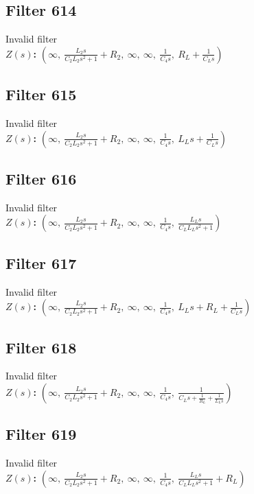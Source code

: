 \documentclass{article}
\begin{document}
\subsection*{Filter 614}
Invalid filter \\ 
\textbf{$Z(s)$:} $\left( \infty, \  \frac{L_{2} s}{C_{2} L_{2} s^{2} + 1} + R_{2}, \  \infty, \  \infty, \  \frac{1}{C_{4} s}, \  R_{L} + \frac{1}{C_{L} s}\right)$ \\ 
\subsection*{Filter 615}
Invalid filter \\ 
\textbf{$Z(s)$:} $\left( \infty, \  \frac{L_{2} s}{C_{2} L_{2} s^{2} + 1} + R_{2}, \  \infty, \  \infty, \  \frac{1}{C_{4} s}, \  L_{L} s + \frac{1}{C_{L} s}\right)$ \\ 
\subsection*{Filter 616}
Invalid filter \\ 
\textbf{$Z(s)$:} $\left( \infty, \  \frac{L_{2} s}{C_{2} L_{2} s^{2} + 1} + R_{2}, \  \infty, \  \infty, \  \frac{1}{C_{4} s}, \  \frac{L_{L} s}{C_{L} L_{L} s^{2} + 1}\right)$ \\ 
\subsection*{Filter 617}
Invalid filter \\ 
\textbf{$Z(s)$:} $\left( \infty, \  \frac{L_{2} s}{C_{2} L_{2} s^{2} + 1} + R_{2}, \  \infty, \  \infty, \  \frac{1}{C_{4} s}, \  L_{L} s + R_{L} + \frac{1}{C_{L} s}\right)$ \\ 
\subsection*{Filter 618}
Invalid filter \\ 
\textbf{$Z(s)$:} $\left( \infty, \  \frac{L_{2} s}{C_{2} L_{2} s^{2} + 1} + R_{2}, \  \infty, \  \infty, \  \frac{1}{C_{4} s}, \  \frac{1}{C_{L} s + \frac{1}{R_{L}} + \frac{1}{L_{L} s}}\right)$ \\ 
\subsection*{Filter 619}
Invalid filter \\ 
\textbf{$Z(s)$:} $\left( \infty, \  \frac{L_{2} s}{C_{2} L_{2} s^{2} + 1} + R_{2}, \  \infty, \  \infty, \  \frac{1}{C_{4} s}, \  \frac{L_{L} s}{C_{L} L_{L} s^{2} + 1} + R_{L}\right)$ \\ 
\end{document}
